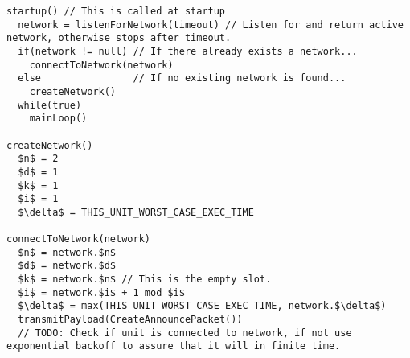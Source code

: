 \begin{lstlisting}[style=customc,mathescape=true,caption={Pseudocode example of special case functions}]
startup() // This is called at startup                                           
  network = listenForNetwork(timeout) // Listen for and return active network, otherwise stops after timeout.
  if(network != null) // If there already exists a network...
    connectToNetwork(network)
  else                // If no existing network is found...
    createNetwork()
  while(true)
    mainLoop()
  
createNetwork()
  $n$ = 2
  $d$ = 1
  $k$ = 1
  $i$ = 1
  $\delta$ = THIS_UNIT_WORST_CASE_EXEC_TIME
  
connectToNetwork(network)
  $n$ = network.$n$
  $d$ = network.$d$
  $k$ = network.$n$ // This is the empty slot.
  $i$ = network.$i$ + 1 mod $i$
  $\delta$ = max(THIS_UNIT_WORST_CASE_EXEC_TIME, network.$\delta$)
  transmitPayload(CreateAnnouncePacket())
  // TODO: Check if unit is connected to network, if not use exponential backoff to assure that it will in finite time.
\end{lstlisting}   
